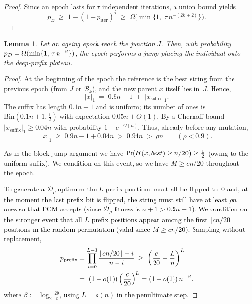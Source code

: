 \documentclass[lettersize,journal]{IEEEtran}
\newcommand{\new}[1]{\textcolor{black}{#1}}
\newcommand{\rerev}[1]{\textcolor{black}{#1}}
\newtheorem{lemma}{Lemma}
\begin{document}
{\begin{proof}
Since an epoch lasts for \(\tau\) independent iterations, a union bound yields
	\[
	p_B
	\;\ge\;
	1-(1-p_{\text{iter}})^{\tau}
	\;\ge\;
	\Omega\!\bigl(\min\{1,\;\tau\,n^{-(2k+2)}\}\bigr).
	\]
	
	\noindent
\end{proof}


\setcounter{theorem}{13}
\begin{lemma} %
	\textcolor{black}{Let an ageing epoch reach the junction $J$.} Then, with probability $\new{p_D}=\Omega(\min\{1,\,\tau\,n^{-\beta}\})$, the epoch performs a jump placing the individual onto the deep-prefix plateau.
\end{lemma}

\begin{proof}
	At the beginning of the epoch the reference is the best string from the previous
	epoch (from $J$ or $\mathcal{B}_k$), and the new parent $x$ itself lies in~$J$.
	Hence,
	\[
	|x|_1\;=\;0.9n-1 \;+\; |x_{\text{suffix}}|_1.
	\]
	The suffix has length $0.1n+1$ and is uniform; its number of ones is
	$\mathrm{Bin}(0.1n+1,\tfrac12)$ with expectation $0.05n+O(1)$.
	By a Chernoff bound
	\(
	|x_{\text{suffix}}|_1\ge 0.04n
	\)
	with probability $1-e^{-\Omega(n)}$.
	Thus, already before any mutation,
	\[
	|x|_1
	\;\ge\;
	0.9n-1 + 0.04n
	\;>\;
	0.94n
	\;>\;
	\rho n
	\qquad(\rho<0.9).
	\tag{1}
	\]
	
As in the block-jump argument we have
	\(
	\Pr\!\bigl(\rerev{H}(x,best)\ge n/20\bigr)\ge\tfrac12
	\)
	(owing to the uniform suffix). We condition on this event, so we have
	 \(M\ge cn/20\) throughout the epoch.
	
\rerev{To generate a $\mathcal{D}_\rho$ optimum the $L$ prefix positions
	must all be flipped to~$0$ and, at the moment the last prefix bit is flipped,
	the string must still have at least $\rho n$ ones so that FCM accepts
	(since $\mathcal{D}_\rho$ fitness is $n+1>0.9n-1$).
	We condition on the stronger event that all $L$ prefix positions appear
	among the first $\lfloor cn/20\rfloor$ positions in the random permutation
	(valid since $M\ge cn/20$).}
	Sampling without replacement,
	\begin{align*}
		p_{\text{prefix}}
&=\rerev{\prod_{i=0}^{L-1}\frac{\lfloor cn/20\rfloor-i}{n-i}}
		\;\ge\;
		\rerev{\left(\frac{c}{20}-\frac{L}{n}\right)^{L}}
		\\ \;&=\;
		\rerev{(1-o(1))\left(\frac{c}{20}\right)^{L}}
		=\rerev{(1-o(1))\,}n^{-\beta}.
	\end{align*}
	where $\beta:=\log_{2}\frac{20}{c}$\rerev{, using $L=o(n)$ in the penultimate step}.
	

\end{proof}}
\end{document}
